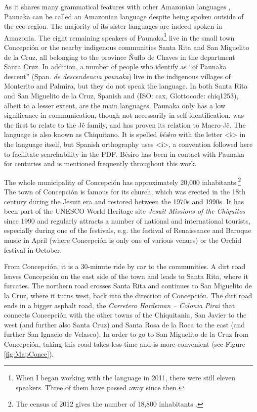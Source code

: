 As it shares many grammatical features with other Amazonian languages \citep[cf.][]{Aikhenvald2012}, Paunaka can be called an Amazonian language despite being spoken outside of the eco-region. The majority of its sister languages are indeed spoken in Amazonia.
The eight remaining speakers of Paunaka\footnote{When I began working with the language in 2011, there were still eleven speakers. Three of them have passed away since then.} live in the small town Concepción or the nearby indigenous communities Santa Rita and San Miguelito de la Cruz, all belonging to the province Ñuflo de Chaves in the department Santa Cruz. In addition, a number of people who identify as “of Paunaka descent”  
(Span. \textit{de descendencia paunaka}) live in the indigenous villages of Monterito and Palmira, but they do not speak the language. In both Santa Rita and San Miguelito de la Cruz, Spanish and  (ISO: cax, Glottocode: chiq1253), albeit to a lesser extent, are the main languages. Paunaka only has a low significance in communication, though not necessarily in self-identification. \citet[]{Adelaar2008} was the first to relate  to the Jê family, and \citet[]{Nikulin2020} has proven its relation to Macro-Jê. The language is also known as Chiquitano. It is spelled \textit{bésɨro} with the letter <ɨ> in the language itself, but Spanish orthography uses <i>, a convention followed here to facilitate searchability in the PDF. Bésiro has been in contact with Paunaka for centuries and is mentioned frequently throughout this work.

The whole municipality of Concepción has approximately 20,000 inhabitants.\footnote{The census of 2012 gives the number of 18,800 inhabitants \citep[88]{INE2015}.} The town of Concepción is famous for its church, which was erected in the 18th century during the Jesuit era and restored between the 1970s and 1990s. It has been part of the \mbox{UNESCO} World Heritage site \textit{Jesuit Missions of the Chiquitos} since 1990 and regularly attracts a number of national and international tourists, especially during one of the festivals, e.g. the festival of Renaissance and Baroque music in April (where Concepción is only one of various venues) or the Orchid festival in October. 

From Concepción, it is a 30-minute ride by car to the communities. A dirt road leaves Concepción on the east side of the town and leads to Santa Rita, where it furcates. The northern road crosses Santa Rita and continues to San Miguelito de la Cruz, where it turns west, back into the direction of Concepción. The dirt road ends in a bigger asphalt road, the \textit{Carretera Hardeman – Colonia Pirai} that connects Concepción with the other towns of the Chiquitania, San Javier to the west (and further also Santa Cruz) and Santa Rosa de la Roca to the east (and further San Ignacio de Velasco). In order to go to San Miguelito de la Cruz from Concepción, taking this road takes less time and is more convenient (see Figure \ref{fig:MapConce}).

